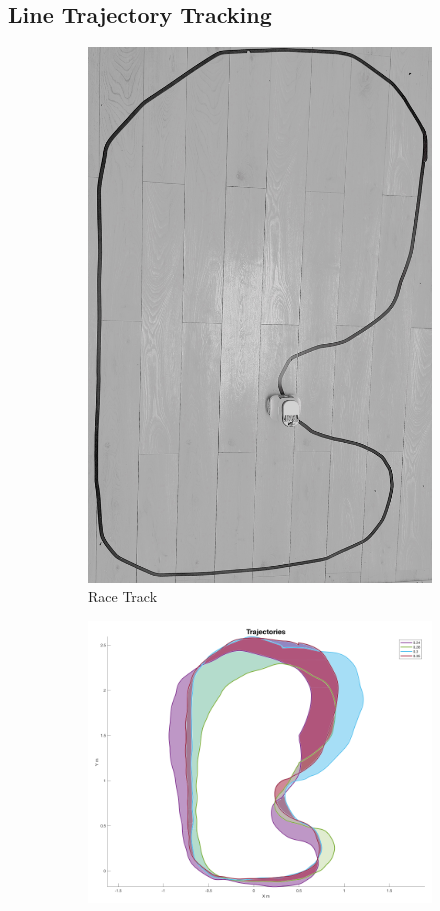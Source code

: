     \subsection{Line Trajectory Tracking}
    \begin{figure}[H]
        \centering
        \begin{subfigure}[c]{0.35\textwidth}
            \includegraphics[height=1.3\textwidth]{TrajTrak.jpeg}
            \caption{Race Track}
        \end{subfigure}
        \hfill
        \begin{subfigure}[c]{0.6\textwidth}
            \includegraphics[width=1.2\textwidth]{Graphs/DeadReckoningTrackMap.png}


\end{subfigure}
\end{figure}
